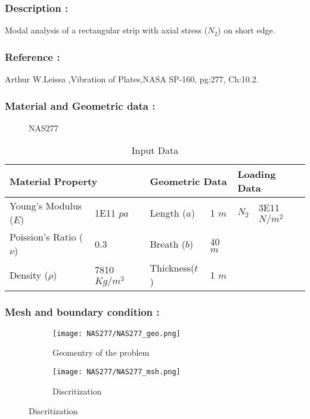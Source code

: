\documentclass[VM.tex]{subfiles}
\begin{document}
\subsubsection*{Description : }
Modal analysis of a rectangular strip with axial stress ($N_2$) on short edge.
\subsubsection*{Reference : }
Arthur W.Leissa ,Vibration of Plates,NASA SP-160, pg:277, Ch:10.2. \\


\subsubsection*{Material and Geometric data : }


\begin{figure}[h!]
\centering

\caption{NAS277} \label{NAS277sch}
\end{figure}
\begin{table}[ht]
\renewcommand{\arraystretch}{1.5}
\centering
\caption{Input Data}
\label{my-labelsdqf}
\begin{tabular}{|ll|ll|ll|}
\hline
\multicolumn{2}{|l|}{\cellcolor[HTML]{C0C0C0}Material Property} & \multicolumn{2}{l|}{\cellcolor[HTML]{C0C0C0}Geometric Data} & \multicolumn{2}{l|}{\cellcolor[HTML]{C0C0C0}Loading Data} \\ \hline  \hline
Young's Modulus ($E$)          & 1E11 $pa$         & Length ($a$)        & 1 $m$        & $N_2$    &  3E11 $N/m^2$      \\
Poission's Ratio ($\nu$)       & 0.3         & Breath ($b$)        & 40 $m$          &        &        \\ 
Density ($\rho$)       & 7810 $Kg/m^3$         & Thickness($t$)        & 1 $m$          &    &        \\ \hline
\end{tabular}
\end{table}




\subsubsection*{Mesh and boundary condition : }





\begin{figure}[h!]
\centering
\begin{subfigure}{0.45\textwidth}
  \texttt{[image: NAS277/NAS277\_geo.png]}
  \caption{Geomentry of the problem}\label{fig:awesome_image1}
\end{subfigure} \hfill
\begin{subfigure}{0.45\textwidth}
  \texttt{[image: NAS277/NAS277\_msh.png]}
  \caption{Discritization}\label{fig:awesome_image2}
\end{subfigure}
\end{figure}
\end{document}
